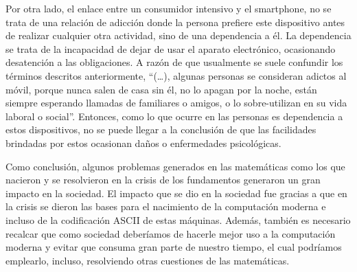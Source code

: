 \documentclass[letterpaper, 12 pt, conference]{ieeeconf}  %
\begin{document}
\begin{.}
Por otra lado, el enlace entre un consumidor intensivo y el smartphone, no se trata de una relación de adicción donde la persona prefiere este dispositivo antes de realizar cualquier otra actividad, sino de una dependencia a él. La dependencia se trata de la incapacidad de dejar de usar el aparato electrónico, ocasionando desatención a las obligaciones. A razón de que usualmente se suele confundir los términos descritos anteriormente, “(…), algunas personas se consideran adictos al móvil, porque nunca salen de casa sin él, no lo apagan por la noche, están siempre esperando llamadas de familiares o amigos, o lo sobre-utilizan en su vida laboral o social”\cite{c16}. Entonces, como lo que ocurre en las personas es dependencia a estos dispositivos, no se puede llegar a la conclusión de que las facilidades brindadas por estos ocasionan daños o enfermedades psicológicas.

Como conclusión, algunos problemas generados en las matemáticas como los que nacieron y se resolvieron en la crisis de los fundamentos generaron un gran impacto en la sociedad. El impacto que se dio en la sociedad fue gracias a que en la crisis se dieron las bases para el nacimiento de la computación moderna e incluso de la codificación ASCII de estas máquinas. Además, también es necesario recalcar que como sociedad deberíamos de hacerle mejor uso a la computación moderna y evitar que consuma gran parte de nuestro tiempo, el cual podríamos emplearlo, incluso, resolviendo otras cuestiones de las matemáticas. 

\end{.}



\addtolength{\textheight}{-12cm}   %
\end{document}
